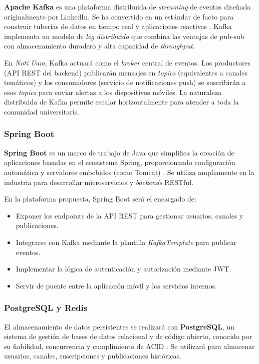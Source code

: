 \textbf{Apache Kafka} es una plataforma distribuida de \textit{streaming} de eventos diseñada originalmente por LinkedIn. Se ha convertido en un estándar de facto para construir tuberías de datos en tiempo real y aplicaciones reactivas \cite{kafka2017streaming}. Kafka implementa un modelo de \textit{log distribuido} que combina las ventajas de pub-sub con almacenamiento duradero y alta capacidad de \textit{throughput}.

En \textit{Noti Uam}, Kafka actuará como el \textit{broker} central de eventos. Los productores (API REST del backend) publicarán mensajes en \textit{topics} (equivalentes a canales temáticos) y los consumidores (servicio de notificaciones push) se suscribirán a esos \textit{topics} para enviar alertas a los dispositivos móviles. La naturaleza distribuida de Kafka permite escalar horizontalmente para atender a toda la comunidad universitaria.

\subsubsection{Spring Boot}

\textbf{Spring Boot} es un marco de trabajo de Java que simplifica la creación de aplicaciones basadas en el ecosistema Spring, proporcionando configuración automática y servidores embebidos (como Tomcat) \cite{spring2023boot}. Se utiliza ampliamente en la industria para desarrollar microservicios y \textit{backends} RESTful.

En la plataforma propuesta, Spring Boot será el encargado de:

\begin{itemize}
    \item Exponer los endpoints de la API REST para gestionar usuarios, canales y publicaciones.
    \item Integrarse con Kafka mediante la plantilla \textit{KafkaTemplate} para publicar eventos.
    \item Implementar la lógica de autenticación y autorización mediante JWT.
    \item Servir de puente entre la aplicación móvil y los servicios internos.
\end{itemize}

\subsubsection{PostgreSQL y Redis}

El almacenamiento de datos persistentes se realizará con \textbf{PostgreSQL}, un sistema de gestión de bases de datos relacional y de código abierto, conocido por su fiabilidad, concurrencia y cumplimiento de ACID \cite{postgresql2024docs}. Se utilizará para almacenar usuarios, canales, suscripciones y publicaciones históricas.

